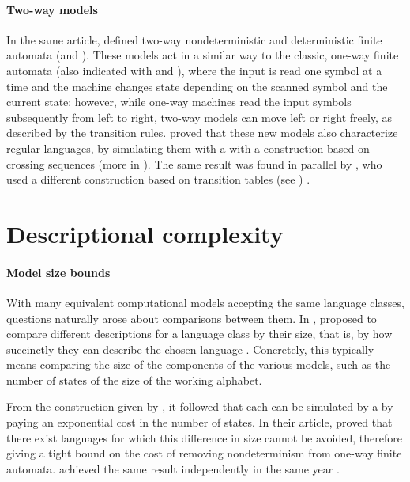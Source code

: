 \paragraph{Two-way models} In the same article, \citeauthor{RabSco59} defined two-way nondeterministic and deterministic finite automata (\TNFA and \TDFA).
These models act in a similar way to the classic, one-way finite automata (also indicated with \ONFA and \ODFA), where the input is read one symbol at a time and the machine changes state depending on the scanned symbol and the current state; however, while one-way machines read the input symbols subsequently from left to right, two-way models can move left or right freely, as described by the transition rules.
\citeauthor{RabSco59} proved that these new models also characterize regular languages, by simulating them with a \ONFA with a construction based on crossing sequences (more in ).
The same result was found in parallel by \citeauthor{She59}, who used a different construction based on transition tables (see ) \cite{She59}.



\section{Descriptional complexity}

\paragraph{Model size bounds} With many equivalent computational models accepting the same language classes, questions naturally arose about comparisons between them.
In \citeyear{MeyFis71}, \citeauthor{MeyFis71} proposed to compare different descriptions for a language class by their size, that is, by how succinctly they can describe the chosen language \cite{MeyFis71}.
Concretely, this typically means comparing the size of the components of the various models, such as the number of states of the size of the working alphabet.

From the construction given by \cite{RabSco59}, it followed that each \NFA can be simulated by a \DFA by paying an exponential cost in the number of states.
In their article, \citeauthor{MeyFis71} proved that there exist languages for which this difference in size cannot be avoided, therefore giving a tight bound on the cost of removing nondeterminism from one-way finite automata.
\citeauthor{Moo71} achieved the same result independently in the same year \cite{Moo71}.

